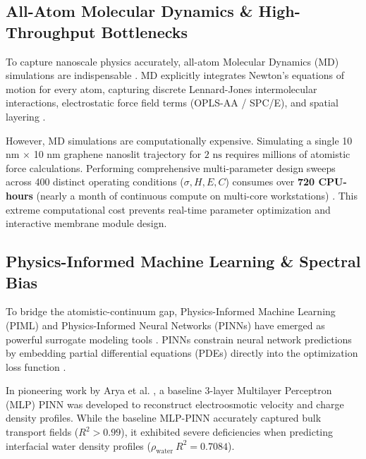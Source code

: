 \documentclass[3p,preprint,12pt,numbers,square,sort&compress]{elsarticle}
\begin{document}
\subsection{All-Atom Molecular Dynamics \& High-Throughput Bottlenecks}
To capture nanoscale physics accurately, all-atom Molecular Dynamics (MD) simulations are indispensable \cite{rahaman2019}. MD explicitly integrates Newton's equations of motion for every atom, capturing discrete Lennard-Jones intermolecular interactions, electrostatic force field terms (OPLS-AA / SPC/E), and spatial layering \cite{wang2021}. 

However, MD simulations are computationally expensive. Simulating a single 10 nm $\times$ 10 nm graphene nanoslit trajectory for $2\text{ ns}$ requires millions of atomistic force calculations. Performing comprehensive multi-parameter design sweeps across 400 distinct operating conditions ($\sigma, H, E, C$) consumes over \textbf{720 CPU-hours} (nearly a month of continuous compute on multi-core workstations) \cite{arya2026}. This extreme computational cost prevents real-time parameter optimization and interactive membrane module design.

\subsection{Physics-Informed Machine Learning \& Spectral Bias}
To bridge the atomistic-continuum gap, Physics-Informed Machine Learning (PIML) and Physics-Informed Neural Networks (PINNs) have emerged as powerful surrogate modeling tools \cite{perez2018, lu2021}. PINNs constrain neural network predictions by embedding partial differential equations (PDEs) directly into the optimization loss function \cite{jagtap2020}.

In pioneering work by Arya et al. \cite{arya2026}, a baseline 3-layer Multilayer Perceptron (MLP) PINN was developed to reconstruct electroosmotic velocity and charge density profiles. While the baseline MLP-PINN accurately captured bulk transport fields ($R^2 > 0.99$), it exhibited severe deficiencies when predicting interfacial water density profiles ($\rho_{\text{water}}\ R^2 = 0.7084$).
\end{document}
